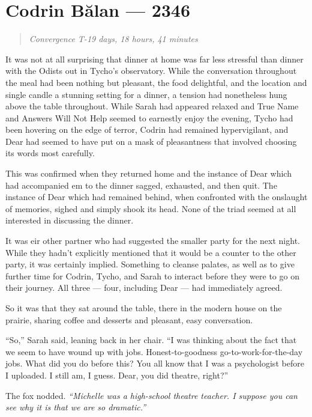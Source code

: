 \hypertarget{codrin-bux103lan-2346}{%
\chapter{Codrin Bălan — 2346}\label{codrin-bux103lan-2346}}

\begin{quote}
\emph{Convergence T-19 days, 18 hours, 41 minutes}
\end{quote}

It was not at all surprising that dinner at home was far less stressful than dinner with the Odists out in Tycho's observatory. While the conversation throughout the meal had been nothing but pleasant, the food delightful, and the location and single candle a stunning setting for a dinner, a tension had nonetheless hung above the table throughout. While Sarah had appeared relaxed and True Name and Answers Will Not Help seemed to earnestly enjoy the evening, Tycho had been hovering on the edge of terror, Codrin had remained hypervigilant, and Dear had seemed to have put on a mask of pleasantness that involved choosing its words most carefully.

This was confirmed when they returned home and the instance of Dear which had accompanied em to the dinner sagged, exhausted, and then quit. The instance of Dear which had remained behind, when confronted with the onslaught of memories, sighed and simply shook its head. None of the triad seemed at all interested in discussing the dinner.

It was eir other partner who had suggested the smaller party for the next night. While they hadn't explicitly mentioned that it would be a counter to the other party, it was certainly implied. Something to cleanse palates, as well as to give further time for Codrin, Tycho, and Sarah to interact before they were to go on their journey. All three — four, including Dear — had immediately agreed.

So it was that they sat around the table, there in the modern house on the prairie, sharing coffee and desserts and pleasant, easy conversation.

``So,'' Sarah said, leaning back in her chair. ``I was thinking about the fact that we seem to have wound up with jobs. Honest-to-goodness go-to-work-for-the-day jobs. What did you do before this? You all know that I was a psychologist before I uploaded. I still am, I guess. Dear, you did theatre, right?''

The fox nodded. \emph{``Michelle was a high-school theatre teacher. I suppose you can see why it is that we are so dramatic.''}

